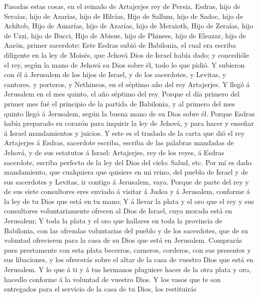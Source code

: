  Pasadas estas cosas, en el reinado de Artajerjes rey de
Persia, Esdras, hijo de Seraías, hijo de Azarías, hijo de Hilcías,
 Hijo de Sallum, hijo de Sadoc, hijo de Achîtob,
 Hijo de Amarías, hijo de Azarías, hijo de Meraioth,
 Hijo de Zeraías, hijo de Uzzi, hijo de Bucci, 
Hijo de Abisue, hijo de Phinees, hijo de Eleazar, hijo de Aarón, primer
sacerdote:  Este Esdras subió de Babilonia, el cual era
escriba diligente en la ley de Moisés, que Jehová Dios de Israel había
dado; y concedióle el rey, según la mano de Jehová su Dios sobre él,
todo lo que pidió.  Y subieron con él á Jerusalem de los
hijos de Israel, y de los sacerdotes, y Levitas, y cantores, y porteros,
y Nethineos, en el séptimo año del rey Artajerjes.  Y llegó
á Jerusalem en el mes quinto, el año séptimo del rey. 
Porque el día primero del primer mes fué el principio de la partida de
Babilonia, y al primero del mes quinto llegó á Jerusalem, según la buena
mano de su Dios sobre él.  Porque Esdras había preparado su
corazón para inquirir la ley de Jehová, y para hacer y enseñar á Israel
mandamientos y juicios.  Y este es el traslado de la carta
que dió el rey Artajerjes á Esdras, sacerdote escriba, escriba de las
palabras mandadas de Jehová, y de sus estatutos á Israel: 
Artajerjes, rey de los reyes, á Esdras sacerdote, escriba perfecto de la
ley del Dios del cielo: Salud, etc.  Por mí es dado
mandamiento, que cualquiera que quisiere en mi reino, del pueblo de
Israel y de sus sacerdotes y Levitas, ir contigo á Jerusalem, vaya.
 Porque de parte del rey y de sus siete consultores eres
enviado á visitar á Judea y á Jerusalem, conforme á la ley de tu Dios
que está en tu mano;  Y á llevar la plata y el oro que el
rey y sus consultores voluntariamente ofrecen al Dios de Israel, cuya
morada está en Jerusalem;  Y toda la plata y el oro que
hallares en toda la provincia de Babilonia, con las ofrendas voluntarias
del pueblo y de los sacerdotes, que de su voluntad ofrecieren para la
casa de su Dios que está en Jerusalem.  Comprarás pues
prestamente con esta plata becerros, carneros, corderos, con sus
presentes y sus libaciones, y los ofrecerás sobre el altar de la casa de
vuestro Dios que está en Jerusalem.  Y lo que á ti y á tus
hermanos pluguiere hacer de la otra plata y oro, hacedlo conforme á la
voluntad de vuestro Dios.  Y los vasos que te son
entregados para el servicio de la casa de tu Dios, los restituirás
